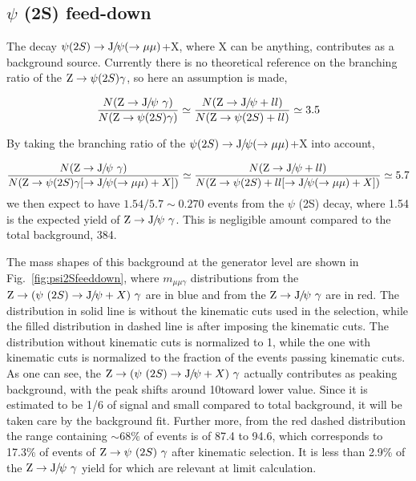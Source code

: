 	\subsection*{$\psi$ (2S) feed-down}
	The decay $\psi (2S)\to{\mathrm{J}\hspace{-.08em}/\hspace{-.14em}\psi}(\to\mu\mu)$+X, where X can be anything, contributes as a background source. 
	Currently there is no theoretical reference on the branching ratio of the $\mathrm{Z}\to\psi (2S)\gamma$, so here an assumption is made,
	
	\begin{equation}
	\frac{N(\cPZ\to\JPsi\ \gamma)}{N(\cPZ\to\psi (2S)\gamma)}\simeq\frac{N(\Z\to\JPsi +ll)}{N(\Z\to\psi (2S)+ll)}\simeq 3.5
	\end{equation}
	
	By taking the branching ratio of the $\psi (2S)\to{\mathrm{J}\hspace{-.08em}/\hspace{-.14em}\psi}(\to\mu\mu)$+X into account,
	
	\begin{equation}
	\frac{N(\cPZ\to\JPsi\ \gamma)}{N(\Z\to\psi (2S)\gamma[\to\JPsi(\to\mu\mu)+X])}\simeq\frac{N(\Z\to\JPsi +ll)}{N(\Z\to\psi (2S)+ll[\to\JPsi(\to\mu\mu)+X])}\simeq 5.7
	\end{equation}
	we then expect to have $1.54/5.7\sim 0.270$ events from the $\psi$ (2S) decay, where 1.54 is the expected yield of $\mathrm{Z}\to{\mathrm{J}\hspace{-.08em}/\hspace{-.14em}\psi}\ \gamma$. This is negligible amount compared to the total background, 384. 
	
	The mass shapes of this background at the generator level are shown in Fig.~\ref{fig:psi2Sfeeddown}, where $m_{\mu\mu\gamma}$ distributions from the $\cPZ\to(\psi\ (2S)\to\JPsi +X)\ \gamma$ are in blue and from the $\mathrm{Z}\to{\mathrm{J}\hspace{-.08em}/\hspace{-.14em}\psi}\ \gamma$ are in red. The distribution in solid line is without the kinematic cuts used in the selection, while the filled distribution in dashed line is after imposing the kinematic cuts. The distribution without kinematic cuts is normalized to 1, while the one with kinematic cuts is normalized to the fraction of the events passing kinematic cuts. 
	As one can see, the $\cPZ\to(\psi\ (2S)\to\JPsi+X)\ \gamma$ actually contributes as peaking background, with the peak shifts around 10\GeV toward lower value. Since it is estimated to be 1/6 of signal and small compared to total background, it will be taken care by the background fit. Further more, from the red dashed distribution the range containing $\sim68\%$ of events is of 87.4 to 94.6\GeV, which corresponds to 17.3\% of events of $\mathrm{Z}\to\psi\ (2S)\ \gamma$ after kinematic selection. It is less than 2.9\% of the $\mathrm{Z}\to{\mathrm{J}\hspace{-.08em}/\hspace{-.14em}\psi}\ \gamma$ yield for which are relevant at limit calculation. 
	
